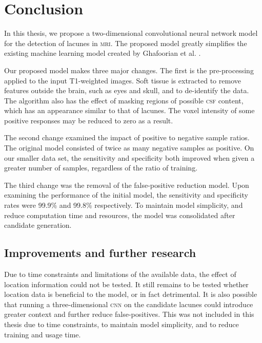 %
%

\chapter{Conclusion}\label{conclusion}

In this thesis, we propose a two-dimensional convolutional neural network model for the detection of lacunes in \textsc{mri}. The proposed model greatly simplifies the existing machine learning model created by Ghafoorian et al. \cite{GhafoorianM.2017Dml3}.

Our proposed model makes three major changes. The first is the pre-processing applied to the input T1-weighted images. Soft tissue is extracted to remove features outside the brain, such as eyes and skull, and to de-identify the data. The algorithm also has the effect of masking regions of possible \textsc{csf} content, which has an appearance similar to that of lacunes. The voxel intensity of some positive responses may be reduced to zero as a result.

The second change examined the impact of positive to negative sample ratios. The original model consisted of twice as many negative samples as positive. On our smaller data set, the sensitivity and specificity both improved when given a greater number of samples, regardless of the ratio of training.

The third change was the removal of the false-positive reduction model. Upon examining the performance of the initial model, the sensitivity and specificity rates were 99.9\% and 99.8\% respectively. To maintain model simplicity, and reduce computation time and resources, the model was consolidated after candidate generation.

\section{Improvements and further research}

Due to time constraints and limitations of the available data, the effect of location information could not be tested. It still remains to be tested whether location data is beneficial to the model, or in fact detrimental. It is also possible that running a three-dimensional \textsc{cnn} on the candidate lacunes could introduce greater context and further reduce false-positives. This was not included in this thesis due to time constraints, to maintain model simplicity, and to reduce training and usage time.

